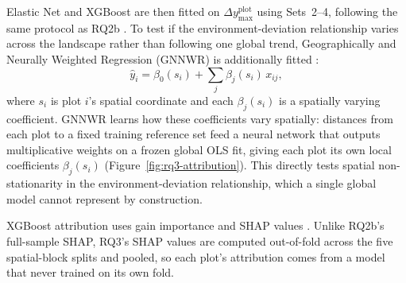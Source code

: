 Elastic Net and XGBoost are then fitted on $\Delta y_{\max}^{\text{plot}}$ using Sets~2--4, following the same protocol as RQ2b \citep{zou2005Regularization_C4_NN, chen2016XGBoost_C4_NN}. To test if the environment-deviation relationship varies across the landscape rather than following one global trend, Geographically and Neurally Weighted Regression (GNNWR) is additionally fitted \citep{du2020Geographically_C6_GWR}:
\begin{equation}
\hat{y}_i = \beta_0(s_i) + \sum_j \beta_j(s_i)\,x_{ij},
\label{eq:gnnwr}
\end{equation}
where $s_i$ is plot $i$'s spatial coordinate and each $\beta_j(s_i)$ is a spatially varying coefficient. GNNWR learns how these coefficients vary spatially: distances from each plot to a fixed training reference set feed a neural network that outputs multiplicative weights on a frozen global OLS fit, giving each plot its own local coefficients $\beta_j(s_i)$ (Figure~\ref{fig:rq3-attribution}). This directly tests spatial non-stationarity in the environment-deviation relationship, which a single global model cannot represent by construction.

XGBoost attribution uses gain importance and SHAP values \citep{lundberg2017}. Unlike RQ2b's full-sample SHAP, RQ3's SHAP values are computed out-of-fold across the five spatial-block splits and pooled, so each plot's attribution comes from a model that never trained on its own fold. 



